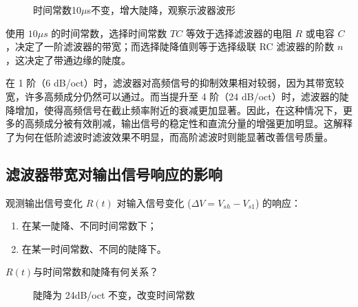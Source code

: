 \documentclass[dvipsnames, svgnames,a4paper,11pt]{article}
\begin{document}
	\begin{figure}[H]
		\centering
		\quad
		\quad
		\quad
		\quad
		\caption{时间常数10$\mu$s不变，增大陡降，观察示波器波形}
		\label{时间常数10μs不变，增大陡降，观察示波器波形}
		\end{figure}
		使用  $10\mu s$ 的时间常数，选择时间常数 \( TC \) 等效于选择滤波器的电阻 \( R \) 或电容 \( C \)，决定了一阶滤波器的带宽；而选择陡降值则等于选择级联 RC 滤波器的阶数 \( n \)，这决定了带通边缘的陡度。

		在 1 阶（6 dB/oct）时，滤波器对高频信号的抑制效果相对较弱，因为其带宽较宽，许多高频成分仍然可以通过。而当提升至 4 阶（24 dB/oct）时，滤波器的陡降增加，使得高频信号在截止频率附近的衰减更加显著。因此，在这种情况下，更多的高频成分被有效削减，输出信号的稳定性和直流分量的增强更加明显。这解释了为何在低阶滤波时滤波效果不明显，而高阶滤波时则能显著改善信号质量。
	\subsection{滤波器带宽对输出信号响应的影响}
	观测输出信号变化 \( R(t) \) 对输入信号变化 (\( \Delta V = V_{sh} - V_{s1} \)) 的响应：

	\begin{enumerate}
		\item 在某一陡降、不同时间常数下；
		\item 在某一时间常数、不同的陡降下。
	\end{enumerate}
	
	
	\begin{question}
		$R(t)$与时间常数和陡降有何关系？
	\end{question}
	\begin{figure}[htbp]
		\centering
		\quad
		\quad
		\quad
		\quad
		\caption{陡降为 24dB/oct 不变，改变时间常数}
		\label{陡降为 24dB/oct 不变，改变时间常数}
		\end{figure}
\end{document}
